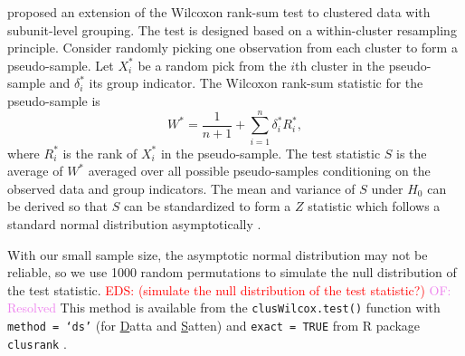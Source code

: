 \documentclass[12pt, letterpaper, titlepage]{article}
\newcommand{\eds}[1]{\textcolor{red}{EDS: (#1)}}
\newcommand{\of}[1]{\textcolor{violet}{OF: #1}}
\begin{document}
\citet{datta2005rank} proposed an extension of the Wilcoxon rank-sum test to
clustered data with subunit-level grouping. The test is designed based on a
within-cluster resampling principle. Consider randomly picking one observation
from each cluster to form a pseudo-sample. Let $X_i^*$ be a random pick from the
$i$th cluster in the pseudo-sample and $\delta_i^*$ its group indicator. The
Wilcoxon rank-sum statistic for the pseudo-sample is
\[
W^* = \frac{1}{n + 1} + \sum_{i=1}^{n} \delta_{i}^{*} R_{i}^{*},
\]
where $R_{i}^{*}$ is the rank of $X_{i}^{*}$ in the pseudo-sample.
The test statistic $S$ is the average of $W^*$ averaged over all possible
pseudo-samples conditioning on the observed data and group indicators.
The mean and variance of $S$ under $H_0$ can be derived so that $S$ can be
standardized to form a $Z$ statistic which follows a standard normal distribution
asymptotically \citep[p.910]{datta2005rank}.


With our small sample size, the asymptotic normal distribution may not be
reliable, so we use 1000 random permutations to simulate the null distribution
of the test statistic.  
\eds{simulate the null distribution of the test statistic?}
\of{Resolved}
This method is available from the \texttt{clusWilcox.test()} function
with \texttt{method = `ds'} (for \underline{D}atta and \underline{S}atten) and 
\texttt{exact = TRUE} from R package
\texttt{clusrank} \citep{jiang2020wilcoxon}. 
\end{document}
